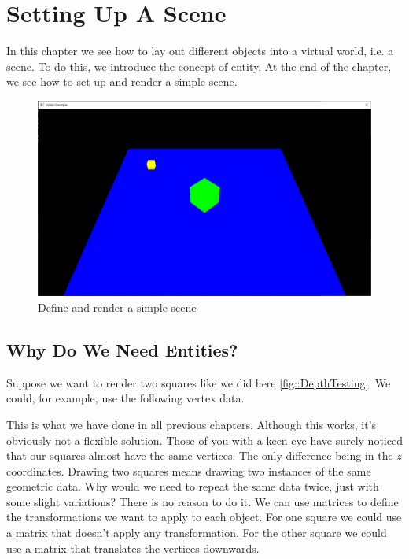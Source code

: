\chapter{Setting Up A Scene}

In this chapter we see how to lay out different objects into a virtual
world, i.e. a scene.
To do this, we introduce the concept of entity.
At the end of the chapter, we see how to set up and render a
simple scene.

\begin{figure}[ht]
    \centering
    \includegraphics[scale=0.20]{images/ChScene/SimpleScene.png}
    \caption{Define and render a simple scene}
    \label{fig::SimpleScene}
\end{figure}

\section{Why Do We Need Entities?}

Suppose we want to render two squares like we did here \ref{fig::DepthTesting}.
We could, for example, use the following vertex data.

\begin{minipage}{\linewidth}{\noindent}
    
\end{minipage}

This is what we have done in all previous chapters.
Although this works, it's obviously not a flexible solution.
Those of you with a keen eye have surely noticed
that our squares almost have the same vertices.
The only difference being in the $z$ coordinates.
Drawing two squares means drawing two instances of the same geometric data.
Why would we need to repeat the same data twice, just with some slight variations?
There is no reason to do it.
We can use matrices to define the transformations we want to apply to each object.
For one square we could use a matrix that doesn't apply any transformation.
For the other square we could use a matrix that translates the vertices downwards.

